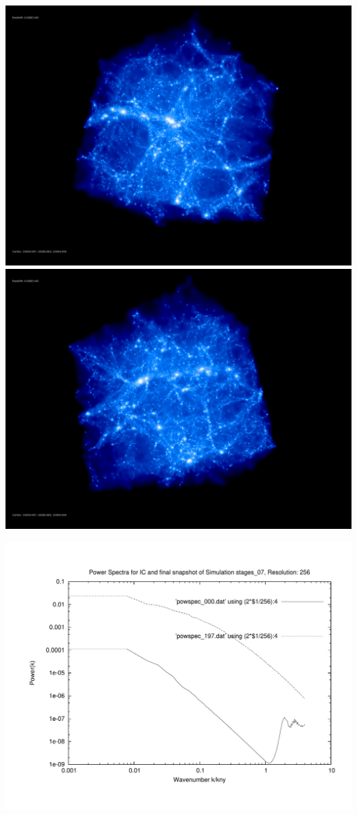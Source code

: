 \includegraphics[scale=0.1]{r256/h100/stages_07/rotate_00074.jpg} 
\includegraphics[scale=0.1]{r256/h100/stages_07/rotate_00131.jpg}

\includegraphics[scale=0.5]{r256/h100/stages_07/plot_powspec_stages_07}

